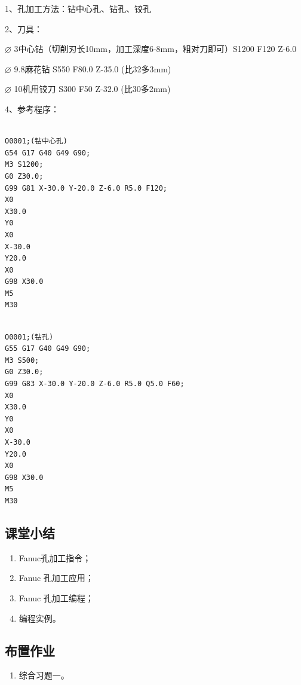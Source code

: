 1、孔加工方法：钻中心孔、钻孔、铰孔

2、刀具：

$\varnothing $ 3中心钻（切削刃长10mm，加工深度6-8mm，粗对刀即可）S1200 F120 Z-6.0

$\varnothing $ 9.8麻花钻 S550 F80.0 Z-35.0 (比32多3mm)

$\varnothing $ 10机用铰刀 S300 F50 Z-32.0 (比30多2mm)

4、参考程序：
\begin{lstlisting}

O0001;(钻中心孔)
G54 G17 G40 G49 G90;
M3 S1200;
G0 Z30.0;
G99 G81 X-30.0 Y-20.0 Z-6.0 R5.0 F120;
X0
X30.0
Y0
X0
X-30.0
Y20.0
X0
G98 X30.0
M5
M30

\end{lstlisting}

\begin{lstlisting}

O0001;(钻孔)
G55 G17 G40 G49 G90;
M3 S500;
G0 Z30.0;
G99 G83 X-30.0 Y-20.0 Z-6.0 R5.0 Q5.0 F60;
X0
X30.0
Y0
X0
X-30.0
Y20.0
X0
G98 X30.0
M5
M30
\end{lstlisting}


\subsection{课堂小结}
\begin{enumerate}[1、]
\item Fanuc孔加工指令；
\item Fanuc 孔加工应用；
\item Fanuc 孔加工编程；
\item 编程实例。
\end{enumerate}

\vfill
\subsection{布置作业}
\begin{enumerate}[1、]
	\item 综合习题一。
\end{enumerate}
\vfill